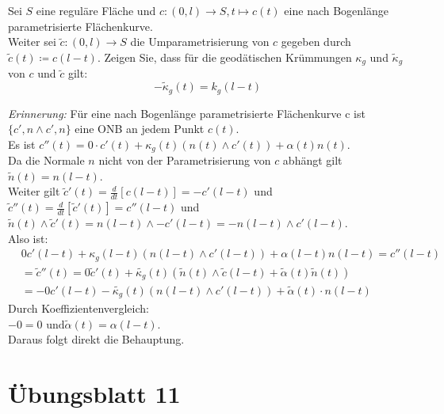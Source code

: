 \begin{assignment}
Sei $ S $ eine reguläre Fläche und $ c: (0,l) \to S, t \mapsto c(t) $ eine nach Bogenlänge parametrisierte Flächenkurve.\\
Weiter sei $\tilde{ c } : (0,l) \to S$ die Umparametrisierung von $ c $ gegeben durch $\tilde{ c }(t) \coloneqq c(l-t)$. Zeigen Sie, dass für die geodätischen Krümmungen $\kappa_g$ und $\tilde{ \kappa }_g$ von $ c $ und $\tilde{ c }$ gilt: 
\begin{equation*}
  -\tilde{\kappa}_g(t) = k_g(l-t) 
\end{equation*}
\end{assignment}
\begin{solution}
  \emph{Erinnerung:} Für eine nach Bogenlänge parametrisierte Flächenkurve c ist \( \{ c', n \land c', n \} \) eine ONB an jedem Punkt \( c(t) \). \\
  Es ist \( c''(t) = 0 \cdot c'(t) + \kappa_g(t)(n(t) \land c'(t)) + \alpha(t) n(t) \). \\
  Da die Normale \( n \) nicht von der Parametrisierung von \( c \) abhängt gilt \( \tilde{n}(t) = n(l-t) \). \\
  Weiter gilt \( \tilde{c}'(t) = \frac{d}{dt}[c(l-t)] = - c'(l-t) \) und \\
  \( \tilde{c}''(t) = \frac{d}{dt}[\tilde{c}'(t)] = c''(l-t) \) und \\
  \( \tilde{n}(t) \land \tilde{c}'(t) = n(l-t) \land - c'(l-t) = -n (l-t) \land c'(l-t) \). \\
  Also ist:
  \begin{align*}
    & 0c'(l-t) + \kappa_g(l-t)(n(l-t) \land c'(l-t)) + \alpha(l-t)n(l-t) = c''(l-t) \\
    &= \tilde{c}''(t) = 0\tilde{c}'(t) + \tilde{\kappa_g}(t)(\tilde{n}(t) \land \tilde{c}(l-t) + \tilde{\alpha}(t) \tilde{n}(t)) \\
    &= -0 c'(l-t) - \tilde{\kappa_g}(t)(n(l-t) \land c'(l-t)) + \tilde{\alpha}(t) \cdot n(l-t)
  \end{align*}
  Durch Koeffizientenvergleich: \\
  \( -0 = 0 \text{ und} \tilde{\alpha}(t) = \alpha(l-t) \). \\
  Daraus folgt direkt die Behauptung.
\end{solution}

%
\section{Übungsblatt 11}
\setcounter{problemcounter}{0}

